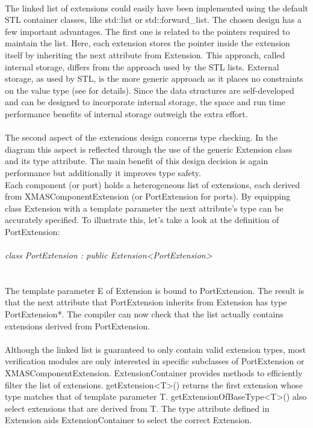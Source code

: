 \documentclass[a4paper,11pt]{article}
\begin{document}
\paragraph{}
The linked list of extensions could easily have been implemented using the default STL container
classes, like std::list or std::forward\_list. The chosen design has a few important advantages.
The first one is related to the pointers required to maintain the list. Here, each extension
stores the pointer inside the extension itself by inheriting the next attribute from Extension.
This approach, called internal storage\cite{linkedlist}, differs from the approach used by the STL lists.
External storage, as used by STL, is the more generic approach as it places no constraints on
the value type (see \cite{linkedlist} for details). Since the data structures are self-developed
and can be designed to incorporate internal storage, the space and run time performance benefits
of internal storage outweigh the extra effort.

\paragraph{}
The second aspect of the extensions design concerns type checking. In the diagram this aspect
is reflected through the use of the generic Extension class and its type attribute. The main
benefit of this design decision is again performance but additionally it improves type safety.\\
Each component (or port) holds a heterogeneous list of extensions, each derived from XMASComponentExtension
(or PortExtension for ports). By equipping class Extension with a template parameter the next attribute's
type can be accurately specified. To illustrate this, let's take a look at the definition of PortExtension:\\\\
\emph{class PortExtension : public Extension\textless PortExtension\textgreater \textbraceleft \\
\textbraceright}\\\\
The template parameter E of Extension is bound to PortExtension. The result is that the next attribute
that PortExtension inherits from Extension has type PortExtension*. The compiler can now check that the
list actually contains extensions derived from PortExtension.

\paragraph{}
Although the linked list is guaranteed to only contain valid extension types, most verification
modules are only interested in specific subclasses of PortExtension or XMASComponentExtension.
ExtensionContainer provides methods to efficiently filter the list of extensions.
getExtension\textless T\textgreater () returns the first extension whose type matches that of
template parameter T. getExtensionOfBaseType\textless T\textgreater () also select extensions
that are derived from T. The type attribute defined in Extension aids ExtensionContainer to
select the correct Extension.\\
\end{document}
